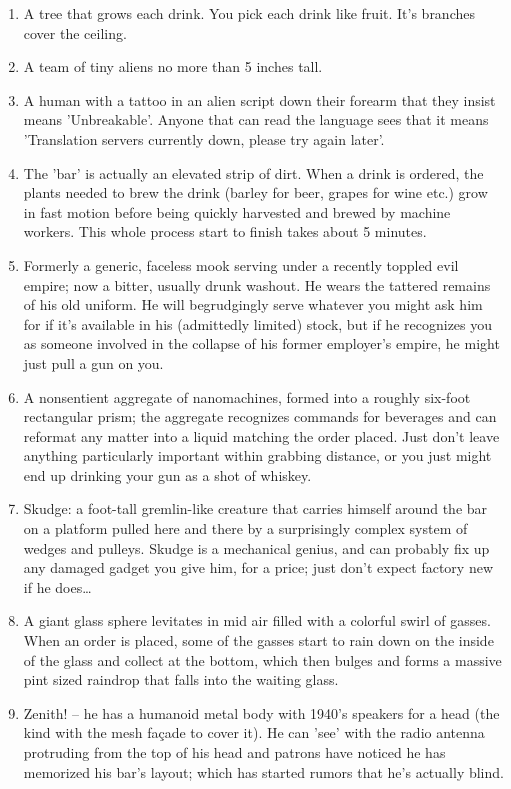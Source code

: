 \documentclass{article}
\begin{document}
\begin{enumerate}
	\item A tree that grows each drink. You pick each drink like fruit. It's branches cover the ceiling.
	\item A team of tiny aliens no more than 5 inches tall.
	\item A human with a tattoo in an alien script down their forearm that they insist means 'Unbreakable'. Anyone that can read the language sees that it means 'Translation servers currently down, please try again later'.
	\item The 'bar' is actually an elevated strip of dirt. When a drink is ordered, the plants needed to brew the drink (barley for beer, grapes for wine etc.) grow in fast motion before being quickly harvested and brewed by machine workers. This whole process start to finish takes about 5 minutes.
	\item Formerly a generic, faceless mook serving under a recently toppled evil empire; now a bitter, usually drunk washout. He wears the tattered remains of his old uniform. He will begrudgingly serve whatever you might ask him for if it's available in his (admittedly limited) stock, but if he recognizes you as someone involved in the collapse of his former employer's empire, he might just pull a gun on you.
	\item A nonsentient aggregate of nanomachines, formed into a roughly six-foot rectangular prism; the aggregate recognizes commands for beverages and can reformat any matter into a liquid matching the order placed. Just don't leave anything particularly important within grabbing distance, or you just might end up drinking your gun as a shot of whiskey.
	\item Skudge: a foot-tall gremlin-like creature that carries himself around the bar on a platform pulled here and there by a surprisingly complex system of wedges and pulleys. Skudge is a mechanical genius, and can probably fix up any damaged gadget you give him, for a price; just don't expect factory new if he does…
	\item A giant glass sphere levitates in mid air filled with a colorful swirl of gasses. When an order is placed, some of the gasses start to rain down on the inside of the glass and collect at the bottom, which then bulges and forms a massive pint sized raindrop that falls into the waiting glass.
	\item Zenith! – he has a humanoid metal body with 1940's speakers for a head (the kind with the mesh façade to cover it). He can 'see' with the radio antenna protruding from the top of his head and patrons have noticed he has memorized his bar's layout; which has started rumors that he's actually blind.

\end{enumerate}
\end{document}
